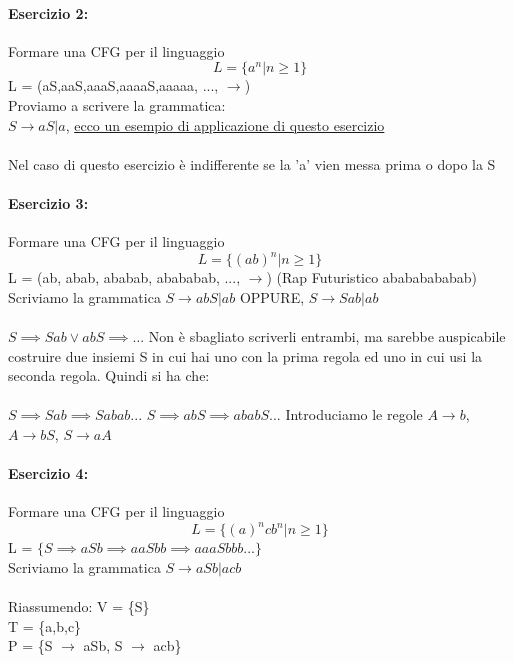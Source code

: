 \documentclass[12pt, a4paper, openany, oneside]{book}
\begin{document}
\paragraph{Esercizio 2: }Formare una CFG per il linguaggio \\
$$L = \{a^{n} | n \geq 1 \}$$
L = (aS,aaS,aaaS,aaaaS,aaaaa, ..., $\to$)
\\ Proviamo a scrivere la grammatica: \\
$S \to aS | a$, \href{https://www.youtube.com/watch?v=ATNolrWTYuU}
{ecco un esempio di applicazione di questo esercizio} 
\\ \\
Nel caso di questo esercizio è indifferente se la 'a' vien messa prima o dopo
la S
\paragraph{Esercizio 3: }Formare una CFG per il linguaggio \\
$$L = \{ (ab)^{n} | n \geq 1 \}$$
L = (ab, abab, ababab, abababab, ..., $\to$) (Rap Futuristico abababababab)
\\ Scriviamo la grammatica
$S \to abS | ab$ OPPURE, $S \to Sab | ab$
\\ \\
$S \implies Sab \vee abS \implies ... $ Non è sbagliato scriverli entrambi, ma
sarebbe auspicabile costruire due insiemi S in cui hai uno con la prima regola
ed uno in cui usi la seconda regola. Quindi si ha che: \\ \\
$S \implies Sab \implies Sabab ... $
$S \implies abS \implies  ababS ... $
Introduciamo le regole $A \to b$, $A \to bS$, $S \to aA$
\paragraph{Esercizio 4: }Formare una CFG per il linguaggio \\
$$L = \{ (a)^{n}cb^{n} | n \geq 1 \}$$
L = $\{S \implies aSb \implies aaSbb \implies aaaSbbb ...\}$
\\ Scriviamo la grammatica
$S \to aSb | acb$
\\ \\
Riassumendo: 
V = \{S\} \\
T = \{a,b,c\} \\
P = \{S $\to$ aSb, S $\to$ acb\}
\end{document}
